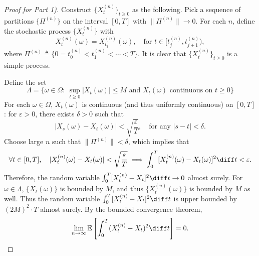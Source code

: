 \begin{proof}[Proof for Part 1)]
Construct $\{X_t^{(n)}\}_{t\ge0}$ as the following.
Pick a sequence of partitions $\{\Pi^{(n)}\}$ on the interval $[0,T]$ with $\|\Pi^{(n)}\|\to0$.
For each $n$, define the stochastic process $\{X_t^{(n)}\}$ with
\[
X_t^{(n)}(\omega) = X_{t_j}^{(n)}(\omega),\quad\text{for }t\in[t_j^{(n)}, t_{j+1}^{(n)}),
\]
where $\Pi^{(n)}\triangleq\{0=t_0^{(n)}<t_1^{(n)}<\cdots<T\}$.
It is clear that $\{X_t^{(n)}\}_{t\ge0}$ is a simple process.

Define the set
\[
\Lambda=\bigg\{
\omega\in\Omega:~
\sup_{t\ge0}|X_t(\omega)|\le M\text{ and $X_t(\omega)$ continuous on $t\ge0$}
\bigg\}
\]
For each $\omega\in\Omega$, $X_t(\omega)$ is continuous (and thus uniformly continuous) on $[0,T]$: for $\varepsilon>0$, there exists $\delta>0$ such that
\[
|X_s(\omega) - X_t(\omega)|<\sqrt{\frac{\varepsilon}{T}},\quad\text{for any }|s-t|<\delta.
\]
Choose large $n$ such that $\|\Pi^{(n)}\|<\delta$, which implies that
\[
\forall t\in[0,T],\quad
|X_t^{(n)}(\omega) - X_t(\omega)|<\sqrt{\frac{\varepsilon}{T}}\implies
\int_0^T[X_t^{(n)}(\omega) - X_t(\omega)]^2\diff t<\varepsilon.
\]
Therefore, the random variable $\int_0^T[X_t^{(n)}- X_t]^2\diff t\to0$ almost surely.
For $\omega\in\Lambda$, $\{X_t(\omega)\}$ is bounded by $M$, and thus $\{X_t^{(n)}(\omega)\}$ is bounded  by $M$ as well.
Thus the random variable $\int_0^T[X_t^{(n)}- X_t]^2\diff t$ is upper bounded by $(2M)^2\cdot T$ almost surely.
By the bounded convergence theorem,
\[
\lim_{n\to\infty}\mathbb{E}\left[
\int_0^T(X_t^{(n)} - X_t)^2\diff t
\right]=0.
\]
\end{proof}
